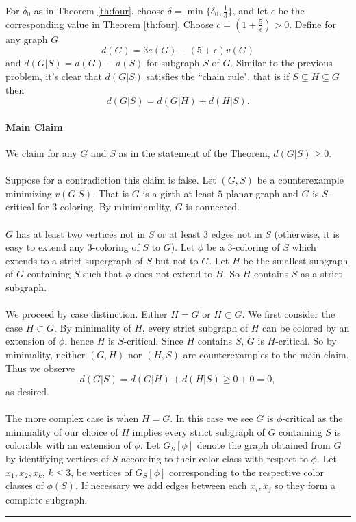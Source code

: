 \documentclass[letterpaper,12pt,oneside,onecolumn]{article}
\newenvironment{proof}{{\bf Proof:  }}{\hfill\rule{2mm}{2mm}}
\begin{document}
\begin{proof}
	For $\delta_0$ as in Theorem \ref{th:four}, choose $\delta = \min\{\delta_0, \frac{1}{3}\}$, and let $\epsilon$ be the corresponding value in Theorem \ref{th:four}. Choose $c = (1+\frac{5}{\epsilon}) > 0$. Define for any graph $G$
	$$d(G) = 3e(G) - (5+\epsilon)v(G)$$
	and $d(G|S) = d(G) - d(S)$ for subgraph $S$ of $G$. Similar to the previous problem, it's clear that $d(G|S)$ satisfies the ``chain rule", that is if $S\subseteq H \subseteq G$ then
	$$d(G|S) = d(G|H) + d(H|S).$$
	\paragraph{Main Claim}
	We claim for any $G$ and $S$ as in the statement of the Theorem, $d(G|S) \geq 0$.
	\paragraph{}
	Suppose for a contradiction this claim is false. Let $(G,S)$ be a counterexample minimizing $v(G|S)$. That is $G$ is a girth at least $5$ planar graph and $G$ is $S$-critical for $3$-coloring. By minimiamlity, $G$ is connected.
	\paragraph{}
	$G$ has at least two vertices not in $S$ or at least $3$ edges not in $S$ (otherwise, it is easy to extend any $3$-coloring of $S$ to $G$). Let $\phi$ be a $3$-coloring of $S$ which extends to a strict supergraph of $S$ but not to $G$. Let $H$ be the smallest subgraph of $G$ containing $S$ such that $\phi$ does not extend to $H$. So $H$ contains $S$ as a strict subgraph.
	\paragraph{}
	We proceed by case distinction. Either $H=G$ or $H\subset G$. We first consider the case $H \subset G$. By minimality of $H$, every strict subgraph of $H$ can be colored by an extension of $\phi$. hence $H$ is $S$-critical. Since $H$ contains $S$, $G$ is $H$-critical. So by minimality, neither $(G,H)$ nor $(H,S)$ are counterexamples to the main claim. Thus we observe
	$$d(G|S) = d(G|H) + d(H|S) \geq 0 + 0 = 0,$$
	as desired.
	\paragraph{}
	The more complex case is when $H=G$. In this case we see $G$ is $\phi$-critical as the minimality of our choice of $H$ implies every strict subgraph of $G$ containing $S$ is colorable with an extension of $\phi$. Let $G_S[\phi]$ denote the graph obtained from $G$ by identifying vertices of $S$ according to their color class with respect to $\phi$. Let $x_1, x_2, x_k$, $k\leq 3$, be vertices of $G_S[\phi]$ corresponding to the respective color classes of $\phi(S)$. If necessary we add edges between each $x_i, x_j$ so they form a complete subgraph.

\end{proof}
\end{document}
